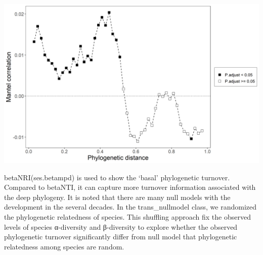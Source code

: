 \documentclass[
]{book}
\newenvironment{Shaded}{\begin{snugshade}}{\end{snugshade}}
\newcommand{\AttributeTok}[1]{\textcolor[rgb]{0.77,0.63,0.00}{#1}}
\newcommand{\CommentTok}[1]{\textcolor[rgb]{0.56,0.35,0.01}{\textit{#1}}}
\newcommand{\DecValTok}[1]{\textcolor[rgb]{0.00,0.00,0.81}{#1}}
\newcommand{\FunctionTok}[1]{\textcolor[rgb]{0.00,0.00,0.00}{#1}}
\newcommand{\NormalTok}[1]{#1}
\newcommand{\OtherTok}[1]{\textcolor[rgb]{0.56,0.35,0.01}{#1}}
\newcommand{\SpecialCharTok}[1]{\textcolor[rgb]{0.00,0.00,0.00}{#1}}
\newcommand{\StringTok}[1]{\textcolor[rgb]{0.31,0.60,0.02}{#1}}
\begin{document}
\begin{Shaded}
\end{Shaded}

\begin{Shaded}
\end{Shaded}

\begin{center}\includegraphics[width=600px]{Images/plot_mantel_corr} \end{center}

betaNRI(ses.betampd) is used to show the `basal' phylogenetic turnover\citep{Liu_Long_term_2017}.
Compared to betaNTI, it can capture more turnover information associated with the deep phylogeny.
It is noted that there are many null models with the development in the several decades.
In the trans\_nullmodel class, we randomized the phylogenetic relatedness of species.
This shuffling approach fix the observed levels of species α-diversity and β-diversity to
explore whether the observed phylogenetic turnover significantly differ from null model that phylogenetic relatedness among species are random.
\end{document}
